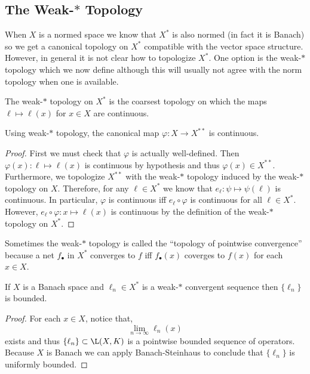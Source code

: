 \documentclass[12pt]{article}
\begin{document}
\subsection{The Weak-$*$ Topology}

\begin{rmk}
When $X$ is a normed space we know that $X^*$ is also normed (in fact it is Banach) so we get a canonical topology on $X^*$ compatible with the vector space structure. However, in general it is not clear how to topologize $X^*$. One option is the weak-$*$ topology which we now define although this will usually not agree with the norm topology when one is available.
\end{rmk}

\begin{defn}
The weak-$*$ topology on $X^*$ is the coarsest topology on which the maps $\ell \mapsto \ell(x)$ for $x \in X$ are continuous. 
\end{defn}

\begin{prop}
Using weak-$*$ topology, the canonical map $\varphi : X \to X^{**}$ is continuous.
\end{prop}

\begin{proof}
First we must check that $\varphi$ is actually well-defined. Then $\varphi(x) : \ell \mapsto \ell(x)$ is continuous by hypothesis and thus $\varphi(x) \in X^{**}$. Furthermore, we topologize $X^{**}$ with the weak-$*$ topology induced by the weak-$*$ topology on $X$. Therefore, for any $\ell \in X^*$ we know that $e_\ell : \psi \mapsto \psi(\ell)$ is continuous. In particular, $\varphi$ is continuous iff $e_\ell \circ \varphi$ is continuous for all $\ell \in X^*$. However, $e_\ell \circ \varphi : x \mapsto \ell(x)$ is continuous by the definition of the weak-$*$ topology on $X^*$.
\end{proof}

\begin{rmk}
Sometimes the weak-$*$ topology is called the ``topology of pointwise convergence'' because a net $f_\bullet$ in $X^*$ converges to $f$ iff $f_\bullet(x)$ coverges to $f(x)$ for each $x \in X$.
\end{rmk}

\begin{prop}
If $X$ is a Banach space and $\ell_n \in X^*$ is a weak-$*$ convergent sequence then $\{ \ell_n \}$ is bounded.
\end{prop}

\begin{proof}
For each $x \in X$, notice that, 
\[ \lim_{n \to \infty} \ell_n(x) \]
exists and thus $\{ \ell_n \} \subset \L(X, K)$ is a pointwise bounded sequence of operators. Because $X$ is Banach we can apply Banach-Steinhaus to conclude that $\{ \ell_n \}$ is uniformly bounded.
\end{proof}
\end{document}

